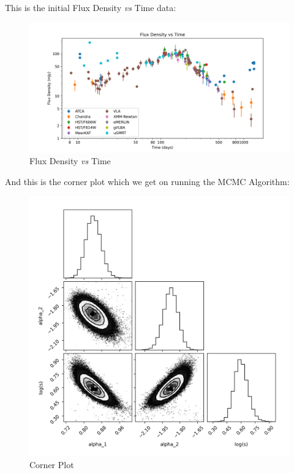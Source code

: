 This is the initial Flux Density \textit{vs} Time data:

\begin{figure}[H]
	\centering
	\includegraphics[width=\textwidth]{Images/FluxDensityvsTime.png}
	\caption{Flux Density \textit{vs} Time}
	\label{fig:flux_density_vs_time}
\end{figure}

And this is the corner plot which we get on running the MCMC Algorithm:

\begin{figure}[H]
	\centering
	\includegraphics[width=\textwidth]{Images/corner_plot.png}
	\caption{Corner Plot}
	\label{fig:corner_plot}
\end{figure}


